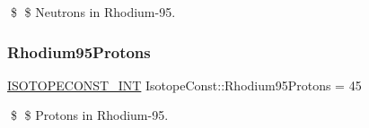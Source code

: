 \$ \$ Neutrons in Rhodium-\/95. \mbox{\label{group___isotope_const-_rhodium-_rh95_ga53fcd36d9a91e560926a398863fdcc8b}} 
\subsubsection{\texorpdfstring{Rhodium95\+Protons}{Rhodium95Protons}}
{\footnotesize\ttfamily \mbox{\hyperlink{group___isotope_const-_macros_ga5f18360b3e99483a35c32d789e62621c}{I\+S\+O\+T\+O\+P\+E\+C\+O\+N\+S\+T\+\_\+\+I\+NT}} Isotope\+Const\+::\+Rhodium95\+Protons = 45}

\$ \$ Protons in Rhodium-\/95. 